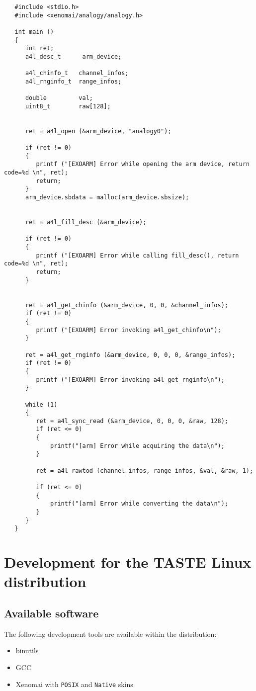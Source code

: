 \documentclass[11pt]{book}
\begin{document}
   \begin{lstlisting}
   #include <stdio.h>
   #include <xenomai/analogy/analogy.h>

   int main ()
   {
      int ret;
      a4l_desc_t      arm_device;

      a4l_chinfo_t   channel_infos;
      a4l_rnginfo_t  range_infos;

      double         val;
      uint8_t        raw[128];


      ret = a4l_open (&arm_device, "analogy0");

      if (ret != 0)
      {
         printf ("[EXOARM] Error while opening the arm device, return code=%d \n", ret);
         return;
      }
      arm_device.sbdata = malloc(arm_device.sbsize);


      ret = a4l_fill_desc (&arm_device);

      if (ret != 0)
      {
         printf ("[EXOARM] Error while calling fill_desc(), return code=%d \n", ret);
         return;
      }


      ret = a4l_get_chinfo (&arm_device, 0, 0, &channel_infos);
      if (ret != 0)
      {
         printf ("[EXOARM] Error invoking a4l_get_chinfo\n");
      }

      ret = a4l_get_rnginfo (&arm_device, 0, 0, 0, &range_infos);
      if (ret != 0)
      {
         printf ("[EXOARM] Error invoking a4l_get_rnginfo\n");
      }

      while (1)
      {
         ret = a4l_sync_read (&arm_device, 0, 0, 0, &raw, 128);
         if (ret <= 0)
         {
             printf("[arm] Error while acquiring the data\n");
         }

         ret = a4l_rawtod (channel_infos, range_infos, &val, &raw, 1);

         if (ret <= 0)
         {
             printf("[arm] Error while converting the data\n");
         }
      }
   }
   \end{lstlisting}

\chapter{Development for the TASTE Linux distribution}
   \section{Available software}
   The following development tools are available within the distribution:
   \begin{itemize}
      \item
         binutils
      \item
         GCC
      \item
         Xenomai with \texttt{POSIX} and \texttt{Native} skins
   \end{itemize}
\end{document}
